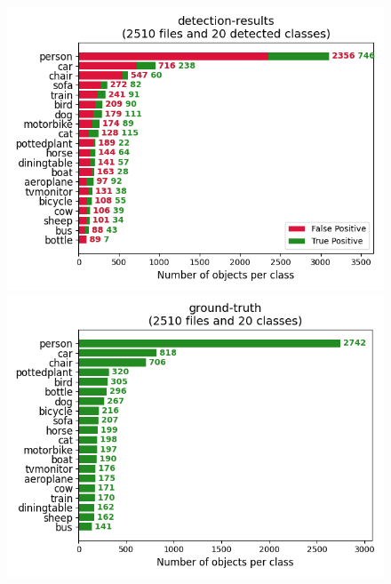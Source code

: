 \documentclass{article}%
\begin{document}
\begin{figure}[H]
    \centering
	\begin{minipage}{0.49\linewidth}
		\centering
		\includegraphics[width=0.9\linewidth]{fast_rcnn/mAP_output/detection-results-info.png}
	\end{minipage}
	\begin{minipage}{0.49\linewidth}
		\centering
		\includegraphics[width=0.9\linewidth]{fast_rcnn/mAP_output/ground-truth-info.png}
	\end{minipage}
\end{figure}
\end{document}
